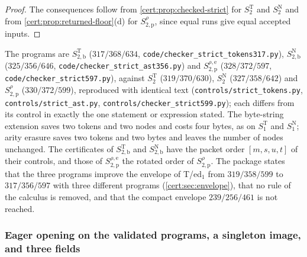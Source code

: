 \begin{proof}
The consequences follow from \cref{cert:prop:checked-strict} for
$S^{\mathrm T}_2$ and $S^{\mathrm N}_2$ and from \cref{cert:prop:returned-floor}(d)
for $S^{\rho}_{2,\mathrm p}$, since equal runs give equal accepted inputs.
\end{proof}

The programs are $S^{\mathrm T}_{2,\mathrm b}$ ($317/368/634$,
\texttt{code/checker\_strict\_tokens317.py}), $S^{\mathrm N}_{2,\mathrm b}$
($325/356/646$, \texttt{code/checker\_strict\_ast356.py}) and
$S^{\rho,\mathrm e}_{2,\mathrm p}$ ($328/372/597$, \texttt{code/checker\_strict597.py}),
against $S^{\mathrm T}_2$ ($319/370/630$), $S^{\mathrm N}_2$ ($327/358/642$) and
$S^{\rho}_{2,\mathrm p}$ ($330/372/599$), reproduced with identical text
(\texttt{controls/strict\_tokens.py}, \texttt{controls/strict\_ast.py},
\texttt{controls/checker\_strict599.py}); each differs from its control in exactly
the one statement or expression stated. The byte-string extension saves two tokens
and two nodes and costs four bytes, as on $S^{\mathrm T}_1$ and
$S^{\mathrm N}_1$; arity erasure saves two tokens and two bytes and leaves the
number of nodes unchanged. The certificates of $S^{\mathrm T}_{2,\mathrm b}$ and
$S^{\mathrm N}_{2,\mathrm b}$ have the packet order $[m,s,u,t]$ of their controls,
and those of $S^{\rho,\mathrm e}_{2,\mathrm p}$ the rotated order of
$S^{\rho}_{2,\mathrm p}$. The package states that the three programs improve the
envelope of T/ed$_1$ from $319/358/599$ to $317/356/597$ with three different
programs (\cref{cert:sec:envelope}), that no rule of the calculus is removed, and
that the compact envelope $239/256/461$ is not reached.

\subsubsection*{Eager opening on the validated programs, a singleton image, and three fields}

